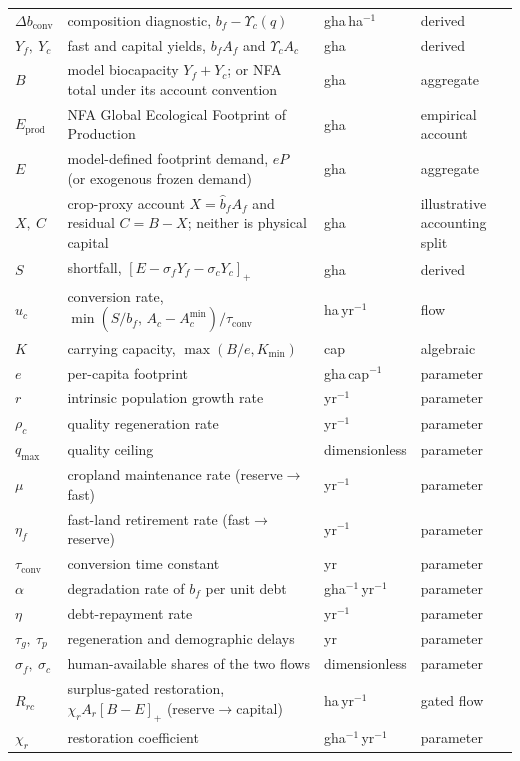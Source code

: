 \documentclass[11pt,a4paper]{article}
\newcommand{\pos}[1]{\left[#1\right]_+}
\newcommand{\dconv}{\Delta b_{\mathrm{conv}}}
\newcommand{\Ups}{\Upsilon_c}
\newcommand{\Acmin}{A_c^{\min}}
\newcommand{\tconv}{\tau_{\mathrm{conv}}}
\begin{document}
\begin{longtable}{>{\raggedright\arraybackslash}p{}>{\raggedright\arraybackslash}p{}>{\raggedright\arraybackslash}p{}>{\raggedright\arraybackslash}p{}}
$\dconv$ & composition diagnostic, $b_f-\Ups(q)$ & gha\,ha$^{-1}$ & derived \\
$Y_f,\ Y_c$ & fast and capital yields, $b_fA_f$ and $\Ups A_c$ & gha & derived \\
$B$ & model biocapacity $Y_f+Y_c$; or NFA total under its account convention & gha & aggregate \\
$E_{\mathrm{prod}}$ & NFA Global Ecological Footprint of Production & gha & empirical account \\
$E$ & model-defined footprint demand, $eP$ (or exogenous frozen demand) & gha & aggregate \\
$X,\ C$ & crop-proxy account $X=\hat b_fA_f$ and residual $C=B-X$; neither is physical capital & gha & illustrative accounting split \\
$S$ & shortfall, $\pos{E-\sigma_fY_f-\sigma_cY_c}$ & gha & derived \\
$u_c$ & conversion rate, $\min(S/b_f,\,A_c-\Acmin)/\tconv$ & ha\,yr$^{-1}$ & flow \\
$K$ & carrying capacity, $\max(B/e,K_{\min})$ & cap & algebraic \\
$e$ & per-capita footprint & gha\,cap$^{-1}$ & parameter \\
$r$ & intrinsic population growth rate & yr$^{-1}$ & parameter \\
$\rho_c$ & quality regeneration rate & yr$^{-1}$ & parameter \\
$q_{\max}$ & quality ceiling & dimensionless & parameter \\
$\mu$ & cropland maintenance rate (reserve$\to$fast) & yr$^{-1}$ & parameter \\
$\eta_f$ & fast-land retirement rate (fast$\to$reserve) & yr$^{-1}$ & parameter \\
$\tconv$ & conversion time constant & yr & parameter \\
$\alpha$ & degradation rate of $b_f$ per unit debt & gha$^{-1}$\,yr$^{-1}$ & parameter \\
$\eta$ & debt-repayment rate & yr$^{-1}$ & parameter \\
$\tau_g,\ \tau_p$ & regeneration and demographic delays & yr & parameter \\
$\sigma_f,\ \sigma_c$ & human-available shares of the two flows & dimensionless & parameter \\
$R_{rc}$ & surplus-gated restoration, $\chi_rA_r\pos{B-E}$ (reserve$\to$capital) & ha\,yr$^{-1}$ & gated flow \\
$\chi_r$ & restoration coefficient & gha$^{-1}$\,yr$^{-1}$ & parameter \\

\end{longtable}
\end{document}
